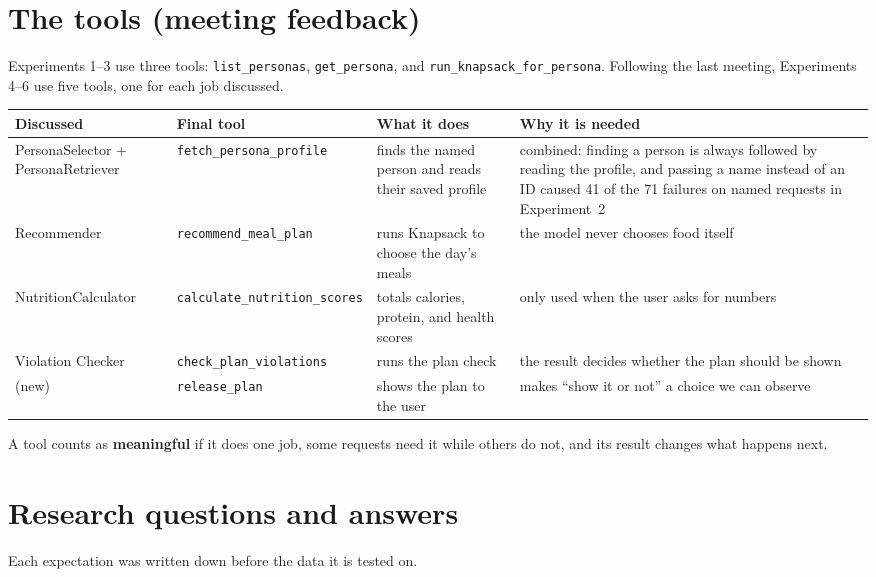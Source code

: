 \documentclass[11pt]{article}
\newcommand{\tool}[1]{\texttt{#1}}
\begin{document}
\section{The tools (meeting feedback)}

Experiments 1--3 use three tools: \tool{list\_personas}, \tool{get\_persona}, and
\tool{run\_knapsack\_for\_persona}. Following the last meeting, Experiments 4--6
use five tools, one for each job discussed.

{\small
\begin{xltabular}{\textwidth}{@{}>{\raggedright\arraybackslash}p{2.9cm} >{\raggedright\arraybackslash}p{3.5cm} >{\raggedright\arraybackslash}p{3.2cm} L@{}}
\toprule
Discussed & Final tool & What it does & Why it is needed \\
\midrule
\endhead
PersonaSelector + PersonaRetriever & \tool{fetch\_\allowbreak persona\_\allowbreak profile} & finds the named person and reads their saved profile & combined: finding a person is always followed by reading the profile, and passing a name instead of an ID caused 41 of the 71 failures on named requests in Experiment~2 \\
Recommender & \tool{recommend\_\allowbreak meal\_\allowbreak plan} & runs Knapsack to choose the day's meals & the model never chooses food itself \\
NutritionCalculator & \tool{calculate\_\allowbreak nutrition\_\allowbreak scores} & totals calories, protein, and health scores & only used when the user asks for numbers \\
Violation Checker & \tool{check\_\allowbreak plan\_\allowbreak violations} & runs the plan check & the result decides whether the plan should be shown \\
(new) & \tool{release\_\allowbreak plan} & shows the plan to the user & makes ``show it or not'' a choice we can observe \\
\bottomrule
\end{xltabular}}

A tool counts as \textbf{meaningful} if it does one job, some requests need it
while others do not, and its result changes what happens next.

\section{Research questions and answers}

Each expectation was written down before the data it is tested on.
\end{document}
